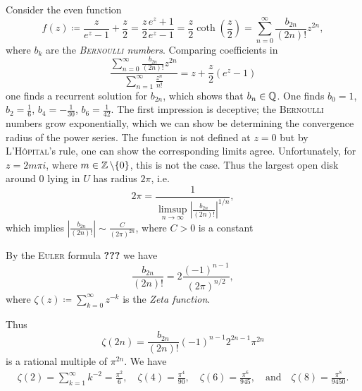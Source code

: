 \documentclass[a4paper,english]{article}
\begin{document}
\begin{example}
    Consider the even function
    \begin{equation*}
        f(z)
        \coloneqq \frac{z}{e^z - 1} + \frac{z}{2} = \frac{z}{2} \frac{e^z + 1}{e^z - 1}
        = \frac{z}{2} \coth\left(\frac{z}{2}\right)
        = \sum_{n = 0}^{\infty} \frac{b_{2 n}}{(2 n)!} z^{2 n},
    \end{equation*}
    where $b_k$ are the \emph{\textsc{Bernoulli} numbers}.
    Comparing coefficients in 
    \begin{equation*}
        \frac{\sum_{n = 0}^{\infty} \frac{b_{2 n}}{(2 n)!} z^{2 n}}{\sum_{n = 1}^{\infty} \frac{z^n}{n!}}
        = z + \frac{z}{2}(e^z - 1)
    \end{equation*}
    one finds a recurrent solution for $b_{2n}$, which shows that $b_n \in \operatorname{\mathbb{Q}}$.
    One finds $b_0 = 1$, $b_2 = \frac{1}{6}$, $b_4 = - \frac{1}{30}$, $b_6 = \frac{1}{42}$.
    The first impression is deceptive; the \textsc{Bernoulli} numbers grow exponentially, which we can show be determining the convergence radius of the power series.
    The function is not defined at $z = 0$ but by \textsc{L'Hôpital}'s rule, one can show the corresponding limits agree.
    Unfortunately, for $z = 2 m \pi i$, where $m \in \operatorname{\mathbb{Z}} \setminus \{ 0 \}$, this is not the case.
    Thus the largest open disk around 0 lying in $U$ has radius $2 \pi$, i.e.
    \begin{equation*}
        2 \pi 
        = \frac{1}{\limsup_{n \to \infty} \left| \frac{b_{2n}}{(2n)!}\right|^{1/n}},
    \end{equation*}
    which implies $\left| \frac{b_{2n}}{(2n)!}\right| \sim \frac{C}{(2 \pi)^{2n}}$, where $C > 0$ is a constant
    
    By the \textsc{Euler} formula \textbf{???} we have
    \begin{equation*}
        \frac{b_{2n}}{(2 n)!}
        = 2 \frac{(-1)^{n - 1}}{(2 \pi)^{n/2}},
    \end{equation*}
    where $\zeta(z) \coloneqq \sum_{k = 0}^{\infty} z^{-k}$ is the \emph{Zeta function}.
    
    Thus
    \begin{equation*}
        \zeta(2 n)
        = \frac{b_{2 n}}{(2 n)!} (-1)^{n - 1} 2^{2 n - 1} \pi^{2 n}
    \end{equation*}
    is a rational multiple of $\pi^{2 n}$.
    We have
    \begin{gather*}
        \zeta(2)
        = \sum_{k = 1}^{\infty} k^{-2}
        = \frac{\pi^2}{6},
        \quad
        \zeta(4) = \frac{\pi^4}{90},
        \quad
        \zeta(6) = \frac{\pi^{6}}{945}, \quad \text{and} \quad
        \zeta(8) = \frac{\pi^{8}}{9450}.
    \end{gather*}
\end{example}
\end{document}
